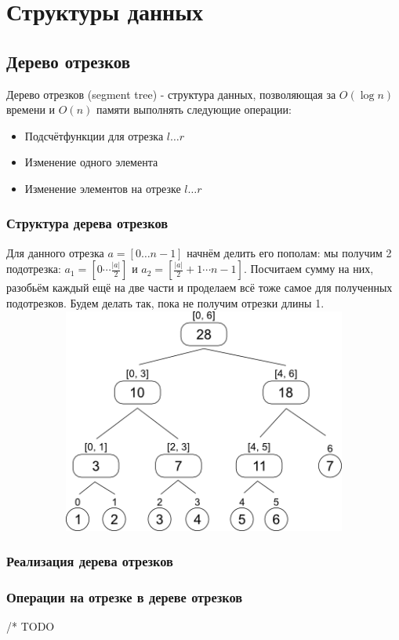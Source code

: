 \chapter{Структуры данных}
\section{Дерево отрезков}
Дерево отрезков (segment tree) - структура данных, позволяющая за $O(\log{n})$ времени и $O(n)$ памяти выполнять следующие операции: \newline
\begin{itemize}
\item{Подсчётфункции для отрезка $l\dots r$}
\item{Изменение одного элемента}
\item{Изменение элементов на отрезке $l\dots r$}
\end{itemize}
\subsection*{Структура дерева отрезков}
Для данного отрезка $a = [0\dots n - 1]$ начнём делить его пополам: мы получим 2 подотрезка: $a_1 = [0\cdots \frac{|a|}{2}]$ и $a_2 = [\frac{|a|}{2} + 1\cdots n - 1]$. Посчитаем сумму на них, разобьём каждый ещё на две части и проделаем всё тоже самое для полученных подотрезков. Будем делать так, пока не получим отрезки длины 1. \newline \newline
\includegraphics[height=210pt, width=400pt]{img/segment_tree} \newpage
\subsection*{Реализация дерева отрезков}

\subsection{Операции на отрезке в дереве отрезков}
/*  TODO\

